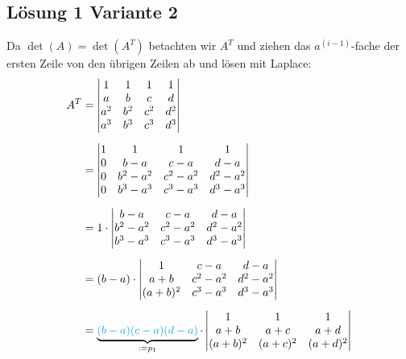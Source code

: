 \documentclass[main.tex]{subfiles}
\begin{document}
\subsection{Lösung 1 Variante 2}
Da $\det (A) = \det (A^T)$ betachten wir $A^T$ und ziehen das $a^{(i-1)}$-fache der ersten Zeile von den übrigen Zeilen ab und lösen mit Laplace:
\begin{align*}
    A^T &=
    \begin{vmatrix}
        1 & 1 & 1 & 1 \\
        a & b & c & d \\
        a^2 & b^2 & c^2 & d^2 \\
        a^3 & b^3 & c^3 & d^3 \\
    \end{vmatrix} \\[2mm]
    &=
    \begin{vmatrix}
        1 & 1 & 1 & 1 \\
        0 & b-a & c-a & d-a \\
        0 & b^2-a^2 & c^2-a^2 & d^2-a^2 \\
        0 & b^3-a^3 & c^3-a^3 & d^3-a^3 \\
    \end{vmatrix} \\[2mm]
    &=
    1 \cdot 
    \begin{vmatrix}
        b-a & c-a & d-a \\
        b^2-a^2 & c^2-a^2 & d^2-a^2 \\
        b^3-a^3 & c^3-a^3 & d^3-a^3 \\
    \end{vmatrix} \\[2mm]
    &= %
    (b-a) \cdot 
    \begin{vmatrix}
        1 & c-a & d-a \\
        a+b & c^2-a^2 & d^2-a^2 \\
        (a+b)^2 & c^3-a^3 & d^3-a^3 \\
    \end{vmatrix} \\[2mm]
    &= \underbrace{\textcolor{Cerulean}{
    {(b-a) (c-a) (d-a)}}}_{:=p_1} \cdot 
    \begin{vmatrix}
              1 &       1 & 1 \\
            a+b &     a+c & a+d \\
        (a+b)^2 & (a+c)^2 & (a+d)^2 \\
    \end{vmatrix} \\[2mm]

\end{align*}
\end{document}
